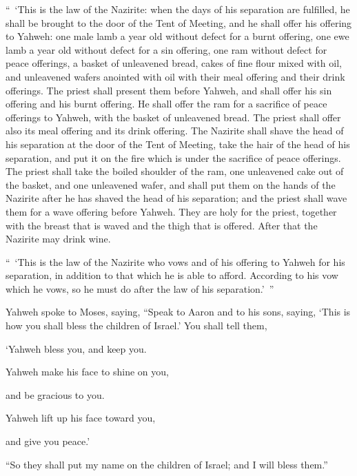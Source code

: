 {\par }{\PP {}“ ‘This is the law of the Nazirite: when the days of his separation are fulfilled, he shall be brought to the door of the Tent of Meeting,
and he shall offer his offering to Yahweh: one male lamb a year old without defect for a burnt offering, one ewe lamb a year old without defect for a sin offering, one ram without defect for peace offerings,
a basket of unleavened bread, cakes of fine flour mixed with oil, and unleavened wafers anointed with oil with their meal offering and their drink offerings.
The priest shall present them before Yahweh, and shall offer his sin offering and his burnt offering.
He shall offer the ram for a sacrifice of peace offerings to Yahweh, with the basket of unleavened bread. The priest shall offer also its meal offering and its drink offering.
The Nazirite shall shave the head of his separation at the door of the Tent of Meeting, take the hair of the head of his separation, and put it on the fire which is under the sacrifice of peace offerings.
The priest shall take the boiled shoulder of the ram, one unleavened cake out of the basket, and one unleavened wafer, and shall put them on the hands of the Nazirite after he has shaved the head of his separation;
and the priest shall wave them for a wave offering before Yahweh. They are holy for the priest, together with the breast that is waved and the thigh that is offered. After that the Nazirite may drink wine.
\par }{\PP {}“ ‘This is the law of the Nazirite who vows and of his offering to Yahweh for his separation, in addition to that which he is able to afford. According to his vow which he vows, so he must do after the law of his separation.’ ”
\par }{\PP {}Yahweh spoke to Moses, saying,
“Speak to Aaron and to his sons, saying, ‘This is how you shall bless the children of Israel.’ You shall tell them,
\par }{\Q {}‘Yahweh bless you, and keep you.
\par }{\QB {}Yahweh make his face to shine on you,
\par }{\QB and be gracious to you.
\par }{\Q {}Yahweh lift up his face toward you,
\par }{\QB and give you peace.’
\par }{\PP {}“So they shall put my name on the children of Israel; and I will bless them.”

}
